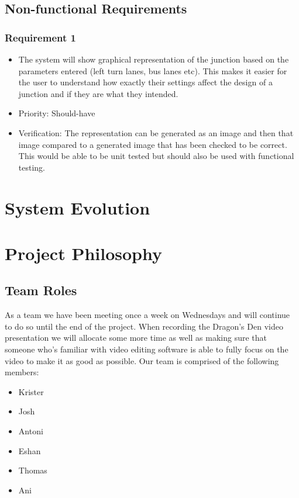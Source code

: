\documentclass{article}
\begin{document}
\subsection{Non-functional Requirements}
\subsubsection{Requirement 1}
\begin{itemize}
  \item The system will show graphical representation of the junction based on 
  the parameters entered (left turn lanes, bus lanes etc). This makes it easier 
  for the user to understand how exactly their settings affect the design of a 
  junction and if they are what they intended.
  \item Priority: Should-have 
  \item Verification: The representation can be generated as an image and then 
  that image compared to a generated image that has been checked to be correct. 
  This would be able to be unit tested but should also be used  with functional 
  testing.
\end{itemize}

\section{System Evolution}

\section{Project Philosophy}

\subsection{Team Roles}

As a team we have been meeting once a week on Wednesdays and will continue to do 
so until the end of the project. When recording the Dragon's Den video presentation 
we will allocate some more time as well as making sure that someone who's familiar 
with video editing software is able to fully focus on the video to make it as good
as possible. Our team is comprised of the following members:

\begin{itemize}
  \item Krister
  \item Josh 
  \item Antoni
  \item Eshan
  \item Thomas 
  \item Ani
\end{itemize}
\end{document}
